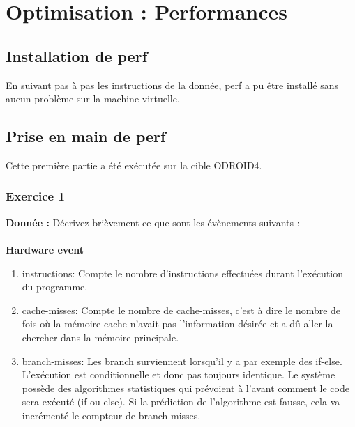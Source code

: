 \newpage
\section{Optimisation : Performances}
\subsection{Installation de perf}
En suivant pas à pas les instructions de la donnée, perf a pu être installé sans aucun problème sur la machine virtuelle. 
\subsection{Prise en main de perf}
Cette première partie a été exécutée sur la cible ODROID4.
\subsubsection{Exercice 1}
\textbf{Donnée : } Décrivez	brièvement	ce	que	sont	les	évènements	suivants	:\\\\
\textbf{Hardware event}
\begin{enumerate}
	\item instructions: Compte le nombre d'instructions effectuées durant l'exécution du programme.
	\item cache-misses: Compte le nombre de cache-misses, c'est à dire le nombre de fois où la mémoire cache n'avait pas l'information désirée et a dû aller la chercher dans la mémoire principale.
	\item branch-misses: Les branch surviennent lorsqu'il y a par exemple des if-else. L'exécution est conditionnelle et donc pas toujours identique. Le système possède des algorithmes statistiques qui prévoient à l'avant comment le code sera exécuté (if ou else). Si la prédiction de l'algorithme est fausse, cela va incrémenté le compteur de branch-misses.
\end{enumerate}

